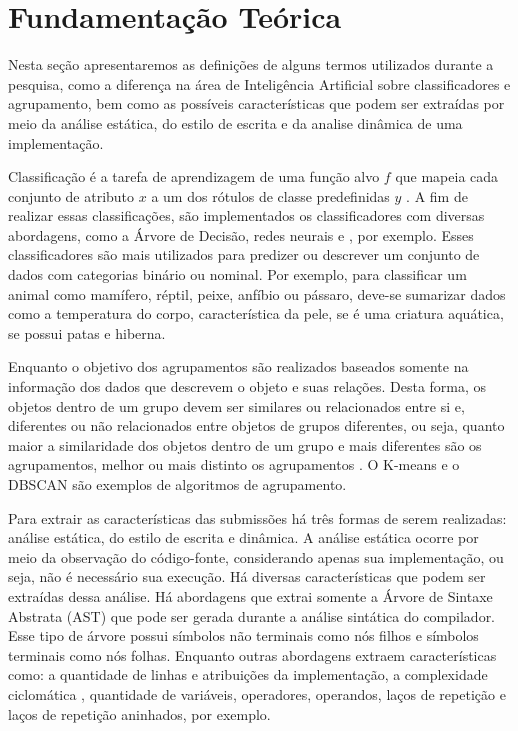 	\section{Fundamentação Teórica}
	\label{sectionFund}
		Nesta seção apresentaremos as definições de alguns termos utilizados
		durante a pesquisa, como a diferença na área de Inteligência Artificial
		sobre classificadores e agrupamento, bem como as possíveis características
		que podem ser extraídas por meio da análise estática, do estilo de escrita
		e da analise dinâmica de uma implementação.
		
		Classificação é a tarefa de aprendizagem de uma função alvo $f$ que mapeia cada
		conjunto de atributo $x$ a um dos rótulos de classe predefinidas $y$ \cite{Tan:2005:ch4}. A
		fim de realizar essas classificações, são implementados os classificadores com
		diversas abordagens, como a Árvore de Decisão, redes neurais e , por exemplo. Esses classificadores são mais utilizados para
		predizer ou descrever um conjunto de dados com categorias binário ou nominal.
		Por exemplo, para classificar um animal como mamífero, réptil, peixe, anfíbio
		ou pássaro, deve-se sumarizar dados como a temperatura do corpo, característica
		da pele, se é uma criatura aquática, se possui patas e hiberna.
		
		Enquanto o objetivo dos agrupamentos são realizados baseados somente na informação
		dos dados que descrevem o objeto e suas relações. Desta forma, os objetos dentro
		de um grupo devem ser similares ou relacionados entre si e, diferentes ou não
		relacionados entre objetos de grupos diferentes, ou seja, quanto maior a similaridade
		dos objetos dentro de um grupo e mais diferentes são os agrupamentos, melhor ou mais
		distinto os agrupamentos \cite{Tan:2005:ch8}. O K-means e o DBSCAN são exemplos de algoritmos de
		agrupamento.
		
		Para extrair as características das submissões há três formas de serem realizadas:
		análise estática, do estilo de escrita e dinâmica. A análise estática ocorre por meio
		da observação do código-fonte, considerando apenas sua implementação, ou seja, não
		é necessário sua execução. Há diversas características que podem ser extraídas dessa
		análise. Há abordagens que extrai somente a Árvore de Sintaxe Abstrata (AST) que pode
		ser gerada durante a análise sintática do compilador. Esse tipo de árvore possui símbolos
		não terminais como nós filhos e símbolos terminais como nós folhas. Enquanto outras
		abordagens extraem características como: a quantidade de linhas e atribuições da
		implementação, a complexidade ciclomática \cite{mccabe}, quantidade de variáveis, 
		operadores, operandos, laços de repetição e laços de repetição aninhados, por exemplo.
		

